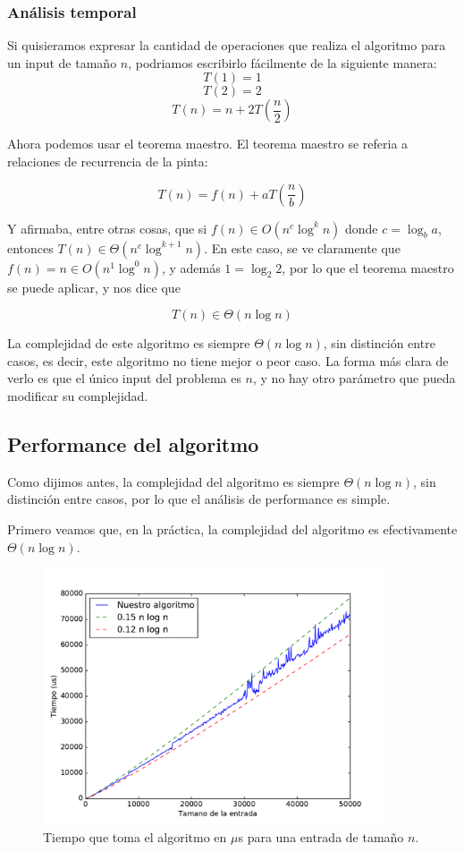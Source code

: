 \subsubsection{Análisis temporal}
Si quisieramos expresar la cantidad de operaciones que realiza el algoritmo para un input de tamaño $n$, podriamos escribirlo fácilmente de la siguiente manera:
\[T(1) = 1\]
\[T(2) = 2\]
\[T(n) = n + 2 T \left(\frac{n}{2}\right)\]

Ahora podemos usar el teorema maestro. El teorema maestro se referia a relaciones de recurrencia de la pinta:

\[T(n) = f(n) + a T\left(\frac{n}{b}\right)\]

Y afirmaba, entre otras cosas, que si $f(n) \in O(n^c \log^k n)$ donde $c = \log_b a$, entonces $T(n) \in \Theta(n^c \log^{k+1} n)$. En este caso, se ve claramente que $f(n) = n \in O(n^1 \log^0 n)$, y además $1 = \log_2 2$, por lo que el teorema maestro se puede aplicar, y nos dice que

\[T(n) \in \Theta(n \log n)\]

La complejidad de este algoritmo es siempre $\Theta(n \log n)$, sin distinción entre casos, es decir, este algoritmo no tiene mejor o peor caso. La forma más clara de verlo es que el único input del problema es $n$, y no hay otro parámetro que pueda modificar su complejidad.

\subsection{Performance del algoritmo}

Como dijimos antes, la complejidad del algoritmo es siempre $\Theta(n \log n)$, sin distinción entre casos, por lo que el análisis de performance es simple.

Primero veamos que, en la práctica, la complejidad del algoritmo es efectivamente $\Theta(n \log n)$.

\begin{figure}[H]
 \centering
	\includegraphics[width=0.9\textwidth]{img/tiempos/kaioken3.pdf}
	\caption{\footnotesize Tiempo que toma el algoritmo en $\mu$s para una entrada de tamaño $n$.}
	\label{fig:kaioken-tiempos3}
\end{figure}

